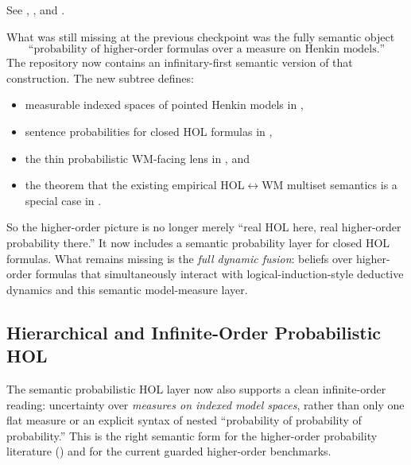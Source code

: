 \documentclass[11pt,openany]{report}
\begin{document}
See
,
,
and .

What was still missing at the previous checkpoint was the fully semantic object
\[
  \text{``probability of higher-order formulas over a measure on Henkin models.''}
\]
The repository now contains an infinitary-first semantic version of that
construction.  The new subtree
 defines:
\begin{itemize}
\item measurable indexed spaces of pointed Henkin models in
  ,
\item sentence probabilities for closed HOL formulas in
  ,
\item the thin probabilistic WM-facing lens in
  , and
\item the theorem that the existing empirical HOL$\leftrightarrow$WM multiset
  semantics is a special case in
  .
\end{itemize}

So the higher-order picture is no longer merely ``real HOL here, real
higher-order probability there.''  It now includes a semantic probability layer
for closed HOL formulas.  What remains missing is the \emph{full dynamic
fusion}: beliefs over higher-order formulas that simultaneously interact with
logical-induction-style deductive dynamics and this semantic model-measure
layer.

\subsection{Hierarchical and Infinite-Order Probabilistic HOL}

The semantic probabilistic HOL layer now also supports a clean
infinite-order reading: uncertainty over \emph{measures on indexed model
spaces}, rather than only one flat measure or an explicit syntax of nested
``probability of probability of probability.''  This is the right semantic form
for the higher-order probability literature
(\cite{Kyburg1988,Gaifman1986HigherOrder,AtkinsonPeijnenburg2013InfiniteOrder})
and for the current guarded higher-order benchmarks.
\end{document}
